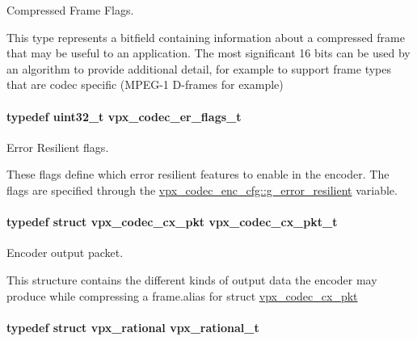 Compressed Frame Flags. 

This type represents a bitfield containing information about a compressed frame that may be useful to an application. The most significant 16 bits can be used by an algorithm to provide additional detail, for example to support frame types that are codec specific (M\+P\+E\+G-\/1 D-\/frames for example) \hypertarget{group__encoder_ga77e0e1fff62556a4f4d54c84467a41f3}{
\paragraph[{vpx\+\_\+codec\+\_\+er\+\_\+flags\+\_\+t}]{\setlength{\rightskip}{0pt plus 5cm}typedef uint32\+\_\+t {\bf vpx\+\_\+codec\+\_\+er\+\_\+flags\+\_\+t}}}\label{group__encoder_ga77e0e1fff62556a4f4d54c84467a41f3}


Error Resilient flags. 

These flags define which error resilient features to enable in the encoder. The flags are specified through the \hyperlink{structvpx__codec__enc__cfg_a4e17173b66ca0d7dfba9978625d7ba76}{vpx\+\_\+codec\+\_\+enc\+\_\+cfg\+::g\+\_\+error\+\_\+resilient} variable. \hypertarget{group__encoder_ga3f711e17fbefac545e8959ef5a023556}{
\paragraph[{vpx\+\_\+codec\+\_\+cx\+\_\+pkt\+\_\+t}]{\setlength{\rightskip}{0pt plus 5cm}typedef struct {\bf vpx\+\_\+codec\+\_\+cx\+\_\+pkt}  {\bf vpx\+\_\+codec\+\_\+cx\+\_\+pkt\+\_\+t}}}\label{group__encoder_ga3f711e17fbefac545e8959ef5a023556}


Encoder output packet. 

This structure contains the different kinds of output data the encoder may produce while compressing a frame.\+alias for struct \hyperlink{structvpx__codec__cx__pkt}{vpx\+\_\+codec\+\_\+cx\+\_\+pkt} \hypertarget{group__encoder_ga2c08c6d71202024f17a5aef71a3d13e5}{
\paragraph[{vpx\+\_\+rational\+\_\+t}]{\setlength{\rightskip}{0pt plus 5cm}typedef struct {\bf vpx\+\_\+rational}  {\bf vpx\+\_\+rational\+\_\+t}}}\label{group__encoder_ga2c08c6d71202024f17a5aef71a3d13e5}


